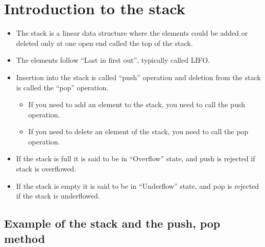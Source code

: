 \section{Introduction to the stack}
\begin{itemize}
    \item The stack is a linear data structure where the elements could be added or deleted only at one open end called the top of the stack. 
    \item The elements follow ``Last in first out'', typically called LIFO.
    \item Insertion into the stack is called ``push'' operation and deletion from the stack is called the ``pop'' operation.
        \begin{itemize}
            \item If you need to add an element to the stack, you need to call the push operation.
            \item If you need to delete an element of the stack, you need to call the pop operation.
        \end{itemize}
    
    \item If the stack is full it is said to be in ``Overflow'' state, and push is rejected if stack is overflowed.
    \item If the stack is empty it is said to be in ``Underflow'' state, and pop is rejected if the stack is underflowed. 
\end{itemize}

\subsection{Example of the stack and the push, pop method}


